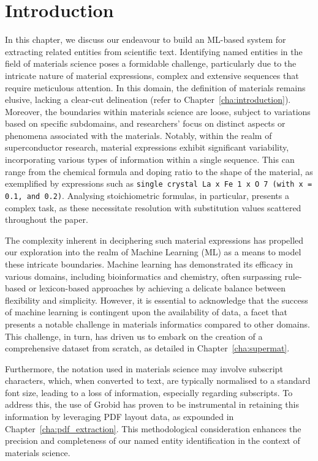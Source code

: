 \section{Introduction}
In this chapter, we discuss our endeavour to build an ML-based system for extracting related entities from scientific text. 
Identifying named entities in the field of materials science poses a formidable challenge, particularly due to the intricate nature of material expressions, complex and extensive sequences that require meticulous attention. In this domain, the definition of materials remains elusive, lacking a clear-cut delineation (refer to Chapter~\ref{cha:introduction}). Moreover, the boundaries within materials science are loose, subject to variations based on specific subdomains, and researchers' focus on distinct aspects or phenomena associated with the materials.
Notably, within the realm of superconductor research, material expressions exhibit significant variability, incorporating various types of information within a single sequence. This can range from the chemical formula and doping ratio to the shape of the material, as exemplified by expressions such as \texttt{single crystal La x Fe 1 x O 7 (with x = 0.1, and 0.2)}. Analysing stoichiometric formulas, in particular, presents a complex task, as these necessitate resolution with substitution values scattered throughout the paper.

The complexity inherent in deciphering such material expressions has propelled our exploration into the realm of Machine Learning (ML) as a means to model these intricate boundaries. Machine learning has demonstrated its efficacy in various domains, including bioinformatics and chemistry, often surpassing rule-based or lexicon-based approaches by achieving a delicate balance between flexibility and simplicity. However, it is essential to acknowledge that the success of machine learning is contingent upon the availability of data, a facet that presents a notable challenge in materials informatics compared to other domains. This challenge, in turn, has driven us to embark on the creation of a comprehensive dataset from scratch, as detailed in Chapter~\ref{cha:supermat}.

Furthermore, the notation used in materials science may involve subscript characters, which, when converted to text, are typically normalised to a standard font size, leading to a loss of information, especially regarding subscripts. To address this, the use of Grobid has proven to be instrumental in retaining this information by leveraging PDF layout data, as expounded in Chapter~\ref{cha:pdf_extraction}. This methodological consideration enhances the precision and completeness of our named entity identification in the context of materials science.

